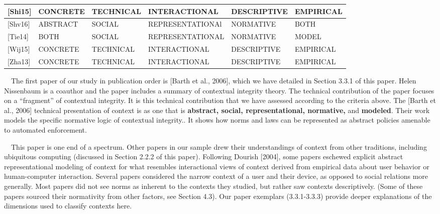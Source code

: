 \documentclass[../thesis.tex]{subfiles}
\begin{document}
\begin{flushleft}
\begin{supertabular}{|m{0.7025598in}|m{0.93095976in}|m{0.8170598in}|m{1.5045599in}|m{0.9316599in}|m{0.9212598in}|}
\textcolor[rgb]{0.2,0.2,0.2}{[Shi15]} &
CONCRETE &
TECHNICAL &
INTERACTIONAL &
DESCRIPTIVE &
EMPIRICAL\\\hline
\textcolor[rgb]{0.2,0.2,0.2}{[Shv16]} &
ABSTRACT &
SOCIAL &
REPRESENTATIONAl &
NORMATIVE &
BOTH\\\hline
\textcolor[rgb]{0.2,0.2,0.2}{[Tie14]} &
BOTH  &
SOCIAL &
REPRESENTATIONAL &
NORMATIVE &
MODEL\\\hline
\textcolor[rgb]{0.2,0.2,0.2}{[Wij15]} &
CONCRETE &
TECHNICAL &
INTERACTIONAL &
DESCRIPTIVE &
EMPIRICAL\\\hline
\textcolor[rgb]{0.2,0.2,0.2}{[Zha13]} &
CONCRETE &
TECHNICAL &
INTERACTIONAL &
DESCRIPTIVE &
EMPIRICAL\\\hline
\end{supertabular}
\end{flushleft}

\bigskip


\bigskip

\ \ The first paper of our study in publication order is [Barth et al.,
2006], which we have detailed in Section 3.3.1 of this paper. Helen
Nissenbaum is a coauthor and the paper includes a summary of contextual
integrity theory. The technical contribution of the paper focuses on a
``fragment'' of contextual
integrity. It is this technical contribution that we have assessed
according to the criteria above. The [Barth et al., 2006] technical
presentation of context is as one that is \textbf{abstract, social,
representational, normative, }and\textbf{ modeled}. Their work models
the specific normative logic of contextual integrity.. It shows how
norms and laws can be represented as abstract policies amenable to
automated enforcement.

\ \ This paper is one end of a spectrum. Other papers in our sample drew
their understandings of context from other traditions, including
ubiquitous computing (discussed in Section 2.2.2 of this paper).
Following Dourish [2004], some papers eschewed explicit abstract
representational modeling of context for what resembles interactional
views of context derived from empirical data about user behavior or
human-computer interaction. Several papers considered the narrow
context of a user and their device, as opposed to social relations more
generally. Most papers did not see norms as inherent to the contexts
they studied, but rather saw contexts descriptively. (Some of these
papers sourced their normativity from other factors, see Section 4.3).
Our paper exemplars (3.3.1-3.3.3) provide deeper explanations of the
dimensions used to classify contexts here.
\end{document}
